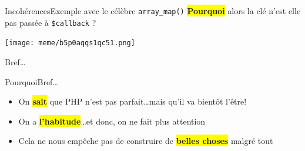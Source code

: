 \begin{frame}{Incohérences}{Exemple avec le célèbre \texttt{array\_map()}}
    \colorbox{yellow}{\textbf{Pourquoi}} alors la clé n'est elle pas passée à \texttt{\$callback} ?

    \begin{center}
        \texttt{[image: meme/b5p0aqqs1qc51.png]}
    \end{center}
\end{frame}

\begin{frameC}{Bref\ldots}

\end{frameC}

\begin{frame}{Pourquoi}{Bref\ldots}
    \begin{itemize}[<+->]
        \item On \colorbox{yellow}{\textbf{sait}} que PHP n'est pas parfait\ldots \pause[\thebeamerpauses] mais qu'il va bientôt l'être!\pause
        \item On a \colorbox{yellow}{\textbf{l'habitude}}\ldots \pause[\thebeamerpauses] et donc, on ne fait plus attention
        \item Cela ne nous empêche pas de construire de \colorbox{yellow}{\textbf{belles choses}} malgré tout
    \end{itemize}
\end{frame}
